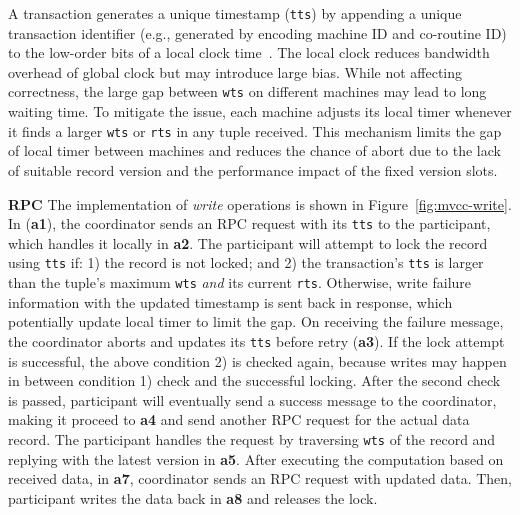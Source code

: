 A transaction generates a unique timestamp (\texttt{tts})
by appending a unique transaction identifier 
(e.g., generated by encoding machine ID and co-routine ID)
to the low-order bits of a local clock time~\cite{bernstein1983multiversion}.
The local clock reduces bandwidth overhead of global clock but 
may introduce large bias. While not affecting correctness,
the large gap between \texttt{wts} on different machines 
may lead to long waiting time. 
To mitigate the issue, each machine adjusts its 
local timer whenever it finds a larger \texttt{wts} or \texttt{rts}
in any tuple received.
This mechanism limits the gap of local timer between machines and 
reduces the chance of abort due to the lack of suitable
record version and the performance impact of 
the fixed version slots. 




{\bf RPC} 
The implementation of {\em write} operations is shown in 
Figure~\ref{fig:mvcc-write}.
In (\step \textbf{a1}),
the coordinator sends an RPC request with its \texttt{tts} to the participant, 
which handles it locally in \step \textbf{a2}. 
The participant will attempt to lock the 
record using \texttt{tts} if:
1) the record is not locked; and
2) the transaction's \texttt{tts} is larger than the tuple's
maximum \texttt{wts} {\em and} its current \texttt{rts}.
Otherwise, write failure information with the updated timestamp is
sent back in response, which potentially update local timer to limit the gap. 
On receiving the failure message, 
the coordinator aborts and updates 
its \texttt{tts} before retry (\step \textbf{a3}).
If the lock attempt is successful, the above condition 2) 
is checked again, because 
writes may happen in between condition 1) check 
and the successful locking. 
After the second check is passed, participant will
eventually send
a success message to the coordinator, making it
proceed to \step \textbf{a4} and send another 
RPC request for the actual data record. 
The participant handles the request by 
traversing \texttt{wts} of the record and 
replying with the latest version in \step \textbf{a5}. 
After executing the computation based on received data, 
in \step \textbf{a7}, coordinator sends an RPC request with updated data. 
Then, participant writes the data back in \step \textbf{a8} and releases the lock.

